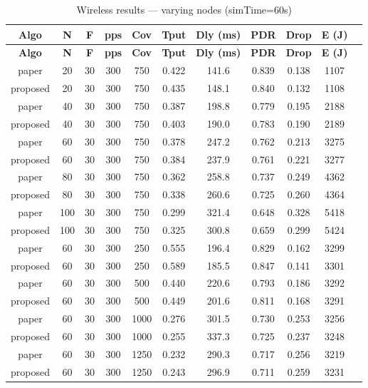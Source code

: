 \documentclass[12pt,a4paper]{report}
\begin{document}
\begin{longtable}{ccccccccccc}
  \caption{Wireless results --- varying nodes (simTime=60s)}\label{tab:wireless-full}\\
  \toprule
  \textbf{Algo} & \textbf{N} & \textbf{F} & \textbf{pps} & \textbf{Cov}
    & \textbf{Tput} & \textbf{Dly (ms)} & \textbf{PDR} & \textbf{Drop} & \textbf{E (J)} \\
  \midrule
  \endfirsthead
  \toprule
  \textbf{Algo} & \textbf{N} & \textbf{F} & \textbf{pps} & \textbf{Cov}
    & \textbf{Tput} & \textbf{Dly (ms)} & \textbf{PDR} & \textbf{Drop} & \textbf{E (J)} \\
  \midrule
  \endhead
  \bottomrule
  \endlastfoot
  paper    & 20 &30&300& 750 & 0.422 & 141.6 & 0.839 & 0.138 & 1107 \\
  proposed & 20 &30&300& 750 & 0.435 & 148.1 & 0.840 & 0.132 & 1108 \\
  paper    & 40 &30&300& 750 & 0.387 & 198.8 & 0.779 & 0.195 & 2188 \\
  proposed & 40 &30&300& 750 & 0.403 & 190.0 & 0.783 & 0.190 & 2189 \\
  paper    & 60 &30&300& 750 & 0.378 & 247.2 & 0.762 & 0.213 & 3275 \\
  proposed & 60 &30&300& 750 & 0.384 & 237.9 & 0.761 & 0.221 & 3277 \\
  paper    & 80 &30&300& 750 & 0.362 & 258.8 & 0.737 & 0.249 & 4362 \\
  proposed & 80 &30&300& 750 & 0.338 & 260.6 & 0.725 & 0.260 & 4364 \\
  paper    & 100&30&300& 750 & 0.299 & 321.4 & 0.648 & 0.328 & 5418 \\
  proposed & 100&30&300& 750 & 0.325 & 300.8 & 0.659 & 0.299 & 5424 \\
  paper    & 60 &30&300& 250 & 0.555 & 196.4 & 0.829 & 0.162 & 3299 \\
  proposed & 60 &30&300& 250 & 0.589 & 185.5 & 0.847 & 0.141 & 3301 \\
  paper    & 60 &30&300& 500 & 0.440 & 220.6 & 0.793 & 0.186 & 3292 \\
  proposed & 60 &30&300& 500 & 0.449 & 201.6 & 0.811 & 0.168 & 3291 \\
  paper    & 60 &30&300& 1000& 0.276 & 301.5 & 0.730 & 0.253 & 3256 \\
  proposed & 60 &30&300& 1000& 0.255 & 337.3 & 0.725 & 0.237 & 3248 \\
  paper    & 60 &30&300& 1250& 0.232 & 290.3 & 0.717 & 0.256 & 3219 \\
  proposed & 60 &30&300& 1250& 0.243 & 296.9 & 0.711 & 0.259 & 3231 \\
\end{longtable}
\end{document}

